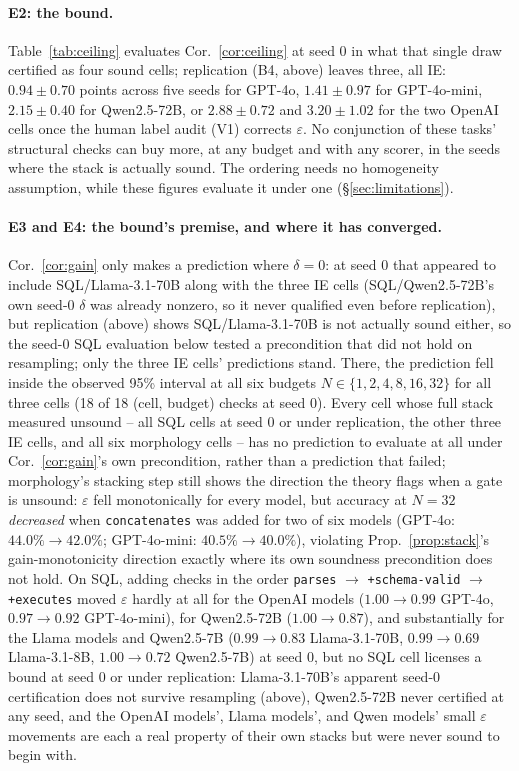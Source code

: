 \documentclass[11pt]{article}
\begin{document}
\paragraph{E2: the bound.} Table~\ref{tab:ceiling} evaluates
Cor.~\ref{cor:ceiling} at seed 0 in what that single draw certified as four
sound cells; replication (B4, above) leaves three, all IE: $0.94\pm0.70$
points across five seeds for GPT-4o, $1.41\pm0.97$ for GPT-4o-mini,
$2.15\pm0.40$ for Qwen2.5-72B, or $2.88\pm0.72$ and $3.20\pm1.02$ for the
two OpenAI cells once the human label audit (V1) corrects $\varepsilon$. No
conjunction of these tasks' structural checks can buy more, at any budget
and with any scorer, in the seeds where the stack is actually sound. The ordering needs no homogeneity assumption, while these figures evaluate it
under one (\S\ref{sec:limitations}).

\paragraph{E3 and E4: the bound's premise, and where it has converged.}
Cor.~\ref{cor:gain} only makes a prediction where $\delta=0$: at seed 0 that
appeared to include SQL/Llama-3.1-70B along with the
three IE cells (SQL/Qwen2.5-72B's own seed-0 $\delta$ was already nonzero,
so it never qualified even before replication), but
replication (above) shows SQL/Llama-3.1-70B is not actually sound either, so the
seed-0 SQL evaluation below tested a precondition that did not hold on
resampling; only the three IE cells' predictions stand. There, the prediction
fell inside the observed 95\% interval at all six budgets
$N\in\{1,2,4,8,16,32\}$ for all three cells (18 of 18 (cell, budget) checks at
seed 0). Every cell whose full stack measured unsound -- all SQL cells at seed 0 or under
replication, the other three IE cells, and all six morphology cells -- has no
prediction to evaluate at all under Cor.~\ref{cor:gain}'s own precondition,
rather than a prediction that failed; morphology's stacking
step still shows the direction the theory flags when a gate is unsound:
$\varepsilon$ fell monotonically for every model, but accuracy at $N=32$
\emph{decreased} when \texttt{concatenates} was added for two of six models
(GPT-4o: $44.0\%\to42.0\%$; GPT-4o-mini: $40.5\%\to40.0\%$), violating
Prop.~\ref{prop:stack}'s gain-monotonicity direction exactly where its own
soundness precondition does not hold. On SQL, adding checks in the order \texttt{parses} $\to$ \texttt{+schema-valid} $\to$
\texttt{+executes} moved $\varepsilon$ hardly at all for the OpenAI models
($1.00\to0.99$ GPT-4o, $0.97\to0.92$ GPT-4o-mini), for Qwen2.5-72B
($1.00\to0.87$), and
substantially for the Llama models and Qwen2.5-7B ($0.99\to0.83$ Llama-3.1-70B,
$0.99\to0.69$ Llama-3.1-8B, $1.00\to0.72$ Qwen2.5-7B) at seed 0, but no SQL cell licenses a bound at
seed 0 or under replication: Llama-3.1-70B's apparent
seed-0 certification does
not survive resampling (above), Qwen2.5-72B never certified at any seed, and the OpenAI models', Llama models', and Qwen models' small
$\varepsilon$ movements are each a real property of their own stacks but were never
sound to begin with.
\end{document}
